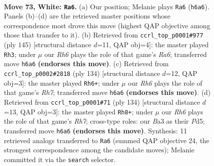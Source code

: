 \documentclass[11pt]{article}
\begin{document}
\clearpage

\begin{figure}[p]\centering
\begin{subfigure}{0.46\textwidth}\centering
\resizebox{\linewidth}{!}{%
\newchessgame
\chessboard[
  setfen={6k1/8/7R/8/bP6/B1p5/6r1/1K6 w - - 0 73},
  showmover=false,
  pgfstyle=straightmove, color=movearrow, markmove={h6-a6}
]}
\caption{}
\end{subfigure}\hfill
\begin{subfigure}{0.46\textwidth}\centering
\resizebox{\linewidth}{!}{%
\newchessgame
\chessboard[
  setfen={4k1b1/2R5/5P2/8/8/r7/8/2K5 b - - 6 73},
  showmover=false,
  pgfstyle=straightmove, color=movearrow, markmove={a3-h3}
]}
\caption{}
\end{subfigure}
\\[4pt]
\begin{subfigure}{0.46\textwidth}\centering
\resizebox{\linewidth}{!}{%
\newchessgame
\chessboard[
  setfen={8/7R/3k4/1P6/2K1B3/8/8/3r2b1 w - - 7 68},
  showmover=false,
  pgfstyle=straightmove, color=movearrow, markmove={h7-h6}
]}
\caption{}
\end{subfigure}\hfill
\begin{subfigure}{0.46\textwidth}\centering
\resizebox{\linewidth}{!}{%
\newchessgame
\chessboard[
  setfen={2k5/7R/3p4/K2P4/2r5/8/8/8 w - - 7 68},
  showmover=false,
  pgfstyle=straightmove, color=movearrow, markmove={h7-h8}
]}
\caption{}
\end{subfigure}
\caption{\textbf{Move 73, White: \texttt{Ra6}.} (a) Our position; Melanie plays \texttt{Ra6} (\texttt{h6a6}). Panels (b)--(d) are the retrieved master positions whose correspondence most drove this move (highest QAP objective among those that transfer to it). (b) Retrieved from \texttt{ccrl\_top\_p0001\#977} (ply 145) [structural distance $d$=11, QAP obj=4]: the master played \texttt{Rh3}; under $\mu$ our \emph{Rh6} plays the role of that game's \emph{Ra6}; transferred move \texttt{h6a6} \textbf{(endorses this move)}. (c) Retrieved from \texttt{ccrl\_top\_p0002\#2818} (ply 134) [structural distance $d$=12, QAP obj=3]: the master played \texttt{Rh6+}; under $\mu$ our \emph{Rh6} plays the role of that game's \emph{Rh7}; transferred move \texttt{h6a6} \textbf{(endorses this move)}. (d) Retrieved from \texttt{ccrl\_top\_p0001\#71} (ply 134) [structural distance $d$=13, QAP obj=3]: the master played \texttt{Rh8+}; under $\mu$ our \emph{Rh6} plays the role of that game's \emph{Rh7}; cross-type roles: our \emph{B}a3 as their \emph{P}d5; transferred move \texttt{h6a6} \textbf{(endorses this move)}. Synthesis: 11 retrieved analogs transferred to \texttt{Ra6} (summed QAP objective 24, the strongest correspondence among the candidate moves); Melanie committed it via the \texttt{search} selector.}
\label{fig:thought-m144}
\end{figure}
\end{document}
